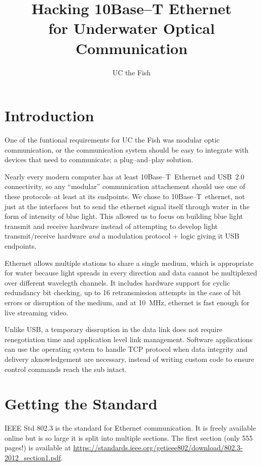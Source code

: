 \documentclass{article}
\begin{document}
\title{Hacking 10Base--T Ethernet\\for Underwater Optical Communication}
\author{UC the Fish}

\maketitle

\section*{Introduction}

One of the funtional requirements for UC the Fish was modular optic communication,
or the communication system should be easy to integrate with devices that need to
communicate; a plug--and--play solution.

Nearly every modern computer has at least \mbox{10Base--T Ethernet} and
\mbox{USB 2.0} connectivity, so any ``modular'' communication attachement
should use one of these protocols--at least at its endpoints.
We chose to \mbox{10Base--T ethernet}, not just at the interfaces but to
send the ethernet signal itself through water in the form of intensity
of blue light.
This allowed us to focus on building blue light transmit and receive
hardware instead of attempting to develop light transmit/receive hardware
\textit{and} a modulation protocol + logic giving it USB endpoints.

Ethernet allows multiple stations to share a single medium,
which is appropriate for water because light spreads in every direction
and data cannot be multiplexed over different wavelegth channels. 
It includes hardware support for cyclic redundancy bit checking,
up to 16 retransmission attempts in the case of bit errors or disruption
of the medium, and at \mbox{10 MHz}, ethernet is fast enough 
for live streaming video.

Unlike USB, a temporary dissruption in the data link does not require
renegotiation time and application level link management.
Software applications can use the operating system to handle TCP protocol
when data integrity and delivery aknowledgement are necessary, instead
of writing custom code to ensure control commands reach the sub intact.

\section*{Getting the Standard}

IEEE Std 802.3 is the standard for Ethernet communication.
It is freely available online but is so large it is split into multiple
sections.
The first section (only 555 pages!) is available at
\url{https://standards.ieee.org/getieee802/download/802.3-2012\_section1.pdf}.
\end{document}
